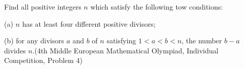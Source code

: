 Find all positive integers $n$ which satisfy the following tow conditions:

(a) $n$ has at least four different positive divisors;

(b) for any divisors $a$ and $b$ of $n$ satisfying $1<a<b<n$,  the number $b-a$ divides $n$.(4th Middle European Mathematical Olympiad, Individual Competition, Problem 4)